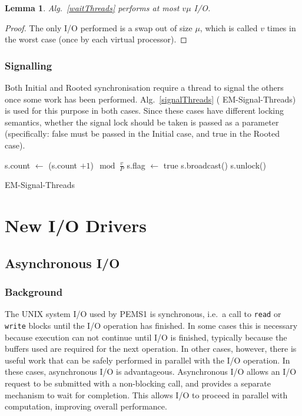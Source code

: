 \documentclass[12pt]{carletoncsthesis}
\newtheorem{lemma}[thm]{Lemma}
\begin{document}
\begin{lemma}
\label{wait-threads-io}
Alg.~\ref{waitThreads} performs at most $v\mu$ I/O.
\end{lemma}
\begin{proof}
The only I/O performed is a swap out of size $\mu$, which is called
$v$ times in the worst case (once by each virtual processor).
\end{proof}

\subsection{Signalling}


Both Initial and Rooted synchronisation require a thread to signal the others
once some work has been performed.  Alg.~\ref{signalThreads} ({\sc
EM-Signal-Threads}) is used for this purpose in both cases.  Since these
cases have different locking semantics, whether the signal lock should be
taken is passed as a parameter (specifically: false must be passed in the
Initial case, and true in the Rooted case).

\begin{algorithm}[h]
	\BlankLine
	s.count $\longleftarrow$ (s.count $+ 1$)$\mod \frac{v}{P}$\;
	s.flag $\longleftarrow$ true \;
	s.broadcast() \;
	s.unlock()\;
	\caption{\sc EM-Signal-Threads}
	\label{signalThreads}
\end{algorithm}



\chapter{New I/O Drivers}
\thispagestyle{empty}
\label{io-drivers}


\section{Asynchronous I/O}
\label{async}


\subsection{Background}


The UNIX system I/O used by PEMS1 is synchronous, i.e.\ a call to {\tt read}
or {\tt write} blocks until the I/O operation has finished.  In some cases
this is necessary because execution can not continue until I/O is finished,
typically because the buffers used are required for the next operation.
In other cases, however, there is useful work that can be safely performed
in parallel with the I/O operation.  In these cases, asynchronous I/O is
advantageous.  Asynchronous I/O allows an I/O request to be submitted with a
non-blocking call, and provides a separate mechanism to wait for completion.
This allows I/O to proceed in parallel with computation, improving overall
performance.
\end{document}
